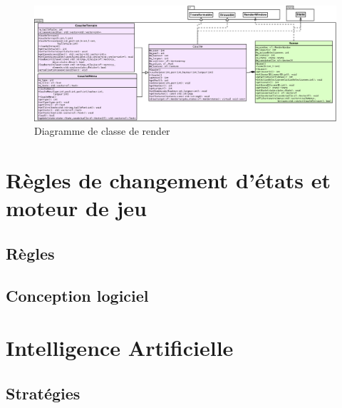 \documentclass[a4paper,12pt]{article}
\begin{document}
\begin{figure}[hbt!]
    \centering
    \includegraphics[width =.8\paperwidth, angle=0]{images/render.png}
    \caption{Diagramme de classe de render}
    \label{fig:render}
\end{figure}




\clearpage
\section{Règles de changement d'états et moteur de jeu}

\subsection{Règles}


\subsection{Conception logiciel}



\clearpage
\section{Intelligence Artificielle}

\subsection{Stratégies}
\end{document}
